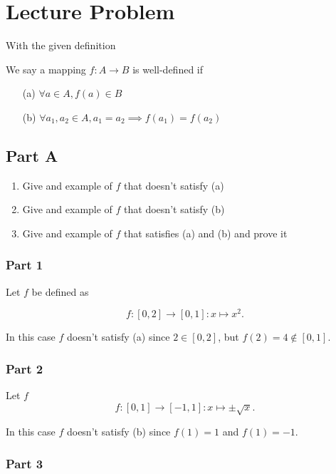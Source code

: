 \documentclass[12pt]{extarticle}
\begin{document}
\section*{Lecture Problem}

With the given definition

\begin{definition}
	We say a mapping $f: A \rightarrow B$ is well-defined if
	\begin{enumerate}
		\item[(a)] $\forall a \in A, f(a) \in B$
		\item[(b)] $\forall a_1, a_2 \in A, a_1 = a_2 \implies f(a_1) = f(a_2)$
	\end{enumerate}
\end{definition}

\subsection*{Part A}

\begin{enumerate}
	\item Give and example of $f$ that doesn't satisfy (a)
	\item Give and example of $f$ that doesn't satisfy (b)
	\item Give and example of $f$ that satisfies (a) and (b) and prove it
\end{enumerate}

\subsubsection*{Part 1}

Let $f$ be defined as 

\[
	f: [0,2] \rightarrow [0,1] : x \mapsto x^2
.\]

In this case $f$ doesn't satisfy (a) since $2 \in [0,2]$, but $f(2) = 4 \notin [0,1]$.

\subsubsection*{Part 2}
Let $f$
\[
	f: [0,1] \rightarrow [-1,1] : x \mapsto \pm \sqrt{x}
.\]

In this case $f$ doesn't satisfy (b) since $f(1) = 1$ and $f(1) = -1$.

\subsubsection*{Part 3}
\end{document}
